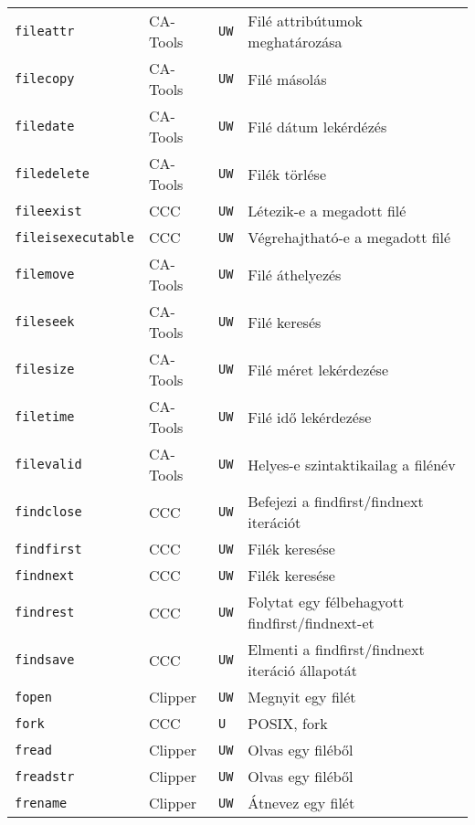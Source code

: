 \begin{tabular}{|l|l|l|l|}
\verb!fileattr!                    & CA-Tools &  {\tt UW} & Filé attribútumok meghatározása\\
\verb!filecopy!                    & CA-Tools &  {\tt UW} & Filé másolás\\
\verb!filedate!                    & CA-Tools &  {\tt UW} & Filé dátum lekérdézés\\
\verb!filedelete!                  & CA-Tools &  {\tt UW} & Filék törlése\\
\verb!fileexist!                   & CCC      &  {\tt UW} & Létezik-e a megadott filé\\
\verb!fileisexecutable!            & CCC      &  {\tt UW} & Végrehajtható-e a megadott filé\\
\verb!filemove!                    & CA-Tools &  {\tt UW} & Filé áthelyezés\\
\verb!fileseek!                    & CA-Tools &  {\tt UW} & Filé keresés\\
\verb!filesize!                    & CA-Tools &  {\tt UW} & Filé méret lekérdezése\\
\verb!filetime!                    & CA-Tools &  {\tt UW} & Filé idő lekérdezése\\
\verb!filevalid!                   & CA-Tools &  {\tt UW} & Helyes-e szintaktikailag a filénév\\
\verb!findclose!                   & CCC      &  {\tt UW} & Befejezi a findfirst/findnext iterációt\\
\verb!findfirst!                   & CCC      &  {\tt UW} & Filék keresése\\
\verb!findnext!                    & CCC      &  {\tt UW} & Filék keresése\\
\verb!findrest!                    & CCC      &  {\tt UW} & Folytat egy félbehagyott findfirst/findnext-et\\
\verb!findsave!                    & CCC      &  {\tt UW} & Elmenti a findfirst/findnext iteráció állapotát\\
\verb!fopen!                       & Clipper  &  {\tt UW} & Megnyit egy filét\\
\verb!fork!                        & CCC      &  {\tt U~} & POSIX, fork\\
\verb!fread!                       & Clipper  &  {\tt UW} & Olvas egy filéből\\
\verb!freadstr!                    & Clipper  &  {\tt UW} & Olvas egy filéből\\
\verb!frename!                     & Clipper  &  {\tt UW} & Átnevez egy filét\\

\end{tabular}
